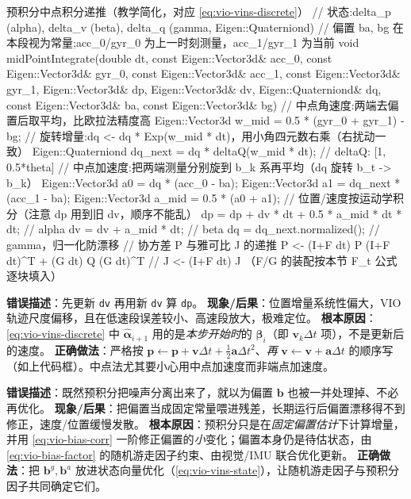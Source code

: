 \begin{codebox}[C++]{预积分中点积分递推（教学简化，对应 \cref{eq:vio-vins-discrete}）}
// 状态:delta_p (alpha), delta_v (beta), delta_q (gamma, Eigen::Quaterniond)
// 偏置 ba, bg 在本段视为常量;acc_0/gyr_0 为上一时刻测量，acc_1/gyr_1 为当前
void midPointIntegrate(double dt,
    const Eigen::Vector3d& acc_0, const Eigen::Vector3d& gyr_0,
    const Eigen::Vector3d& acc_1, const Eigen::Vector3d& gyr_1,
    Eigen::Vector3d& dp, Eigen::Vector3d& dv, Eigen::Quaterniond& dq,
    const Eigen::Vector3d& ba, const Eigen::Vector3d& bg) {
  // 中点角速度:两端去偏置后取平均，比欧拉法精度高
  Eigen::Vector3d w_mid = 0.5 * (gyr_0 + gyr_1) - bg;
  // 旋转增量:dq <- dq * Exp(w_mid * dt)，用小角四元数右乘（右扰动一致）
  Eigen::Quaterniond dq_next = dq * deltaQ(w_mid * dt);   // deltaQ: [1, 0.5*theta]
  // 中点加速度:把两端测量分别旋到 b_k 系再平均（dq 旋转 b_t -> b_k）
  Eigen::Vector3d a0 = dq      * (acc_0 - ba);
  Eigen::Vector3d a1 = dq_next * (acc_1 - ba);
  Eigen::Vector3d a_mid = 0.5 * (a0 + a1);
  // 位置/速度按运动学积分（注意 dp 用到旧 dv，顺序不能乱）
  dp = dp + dv * dt + 0.5 * a_mid * dt * dt;   // alpha
  dv = dv + a_mid * dt;                         // beta
  dq = dq_next.normalized();                    // gamma，归一化防漂移
  // 协方差 P 与雅可比 J 的递推 P <- (I+F dt) P (I+F dt)^T + (G dt) Q (G dt)^T
  // J <- (I+F dt) J  （F/G 的装配按本节 F_t 公式逐块填入）
}
\end{codebox}

\begin{pitfall}
\textbf{错误描述}：先更新 \texttt{dv} 再用新 \texttt{dv} 算 \texttt{dp}。
\textbf{现象/后果}：位置增量系统性偏大，VIO 轨迹尺度偏移，且在低速段误差较小、高速段放大，极难定位。
\textbf{根本原因}：\cref{eq:vio-vins-discrete} 中 $\hat{\boldsymbol{\alpha}}_{i+1}$ 用的是\emph{本步开始时}的 $\hat{\boldsymbol{\beta}}_i$（即 $\mathbf{v}_k\Delta t$ 项），不是更新后的速度。
\textbf{正确做法}：严格按 $\mathbf{p}\leftarrow\mathbf{p}+\mathbf{v}\Delta t+\tfrac12\mathbf{a}\Delta t^2$、\emph{再} $\mathbf{v}\leftarrow\mathbf{v}+\mathbf{a}\Delta t$ 的顺序写（如上代码框）。中点法尤其要小心用中点加速度而非端点加速度。
\end{pitfall}

\begin{pitfall}
\textbf{错误描述}：既然预积分把噪声分离出来了，就以为偏置 $\mathbf{b}$ 也被一并处理掉、不必再优化。
\textbf{现象/后果}：把偏置当成固定常量喂进残差，长期运行后偏置漂移得不到修正，速度/位置缓慢发散。
\textbf{根本原因}：预积分只是在\emph{固定偏置估计}下计算增量，并用 \cref{eq:vio-bias-corr} 一阶修正偏置的\emph{小}变化；偏置本身仍是待估状态，由 \cref{eq:vio-bias-factor} 的随机游走因子约束、由视觉/IMU 联合优化更新。
\textbf{正确做法}：把 $\mathbf{b}^g,\mathbf{b}^a$ 放进状态向量优化（\cref{eq:vio-vins-state}），让随机游走因子与预积分因子共同确定它们。
\end{pitfall}

